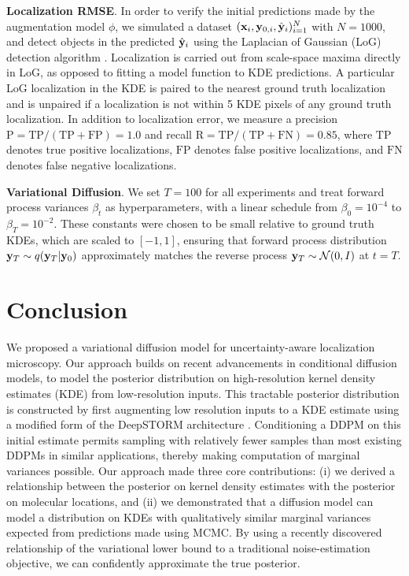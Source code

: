 \documentclass{article}
\begin{document}
\textbf{Localization RMSE}. In order to verify the initial predictions made by the augmentation model $\phi$, we simulated a dataset $(\bold{x}_i,\bold{y}_{0,i},\hat{\bold{y}}_{i})_{i=1}^{N}$ with $N=1000$, and  detect objects in the predicted $\hat{\bold{y}}_{i}$ using the Laplacian of Gaussian (LoG) detection algorithm \citep{Kong2013}. Localization is carried out from scale-space maxima directly in LoG, as opposed to fitting a model function to KDE predictions. A particular LoG localization in the KDE is paired to the nearest ground truth localization and is unpaired if a localization is not within 5 KDE pixels of any ground truth localization. In addition to localization error, we measure a precision $\mathrm{P = TP/(TP + FP)} = 1.0$ and recall $\mathrm{R = TP/(TP + FN)} = 0.85$, where $\mathrm{TP}$ denotes true positive localizations, $\mathrm{FP}$ denotes false positive localizations, and $\mathrm{FN}$ denotes false negative localizations.


\textbf{Variational Diffusion}. We set $T = 100$ for all experiments and treat forward process variances $\beta_{t}$ as hyperparameters, with a linear schedule from $\beta_{0}=10^{-4}$ to $\beta_{T}=10^{-2}$.
These constants were chosen to be small relative to ground truth KDEs, which are scaled to $[-1,1]$, ensuring that forward process distribution $\bold{y}_{T}\sim q(\bold{y}_{T}|\bold{y}_{0})$ approximately matches the reverse process $\bold{y}_T\sim \mathcal{N}(0, I)$ at $t=T$.


\section{Conclusion}

We proposed a variational diffusion model for uncertainty-aware localization microscopy. Our approach builds on recent advancements in conditional diffusion models, to model the posterior distribution on high-resolution kernel density estimates (KDE) from low-resolution inputs. This tractable posterior distribution is constructed by first augmenting low resolution inputs to a KDE estimate using a modified form of the DeepSTORM architecture \citep{Nehme2020}. Conditioning a DDPM on this initial estimate permits sampling with relatively fewer samples than most existing DDPMs in similar applications, thereby making computation of marginal variances possible. Our approach made three core contributions: (i) we derived a relationship between the posterior on kernel density estimates with the posterior on molecular locations, and (ii) we demonstrated that a diffusion model can model a distribution on KDEs with qualitatively similar marginal variances expected from predictions made using MCMC. By using a recently discovered relationship of the variational lower bound to a traditional noise-estimation objective, we can confidently approximate the true posterior.
\end{document}
